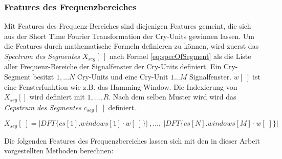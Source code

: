 \subsubsection*{Features des Frequenzbereiches}

Mit Features des Frequenz-Bereiches sind diejenigen Features gemeint, die sich aus der Short Time Fourier Transformation der Cry-Units gewinnen lassen. Um die Features durch mathematische Formeln definieren zu können, wird zuerst das \emph{Spectrum des Segmentes} $X_{seg}[\;]$ nach Formel \ref{eq:specOfSegment} als die Liste aller Frequenz-Bereiche der Signalfenster der Cry-Units definiert. Ein Cry-Segment besitzt $1 , \ldots N$ Cry-Units und eine Cry-Unit $1 \ldots M$ Signalfenster. $w[\;]$ ist eine Fensterfunktion wie z.B. das Hamming-Window. Die Indexierung von $X_{seg}[ ]$ wird definiert mit $1 , \ldots , R$. Nach dem selben Muster wird wird das \emph{Cepstrum des Segmentes} $c_{seg}[\;]$ definiert.

\begin{equation}
X_{seg}[\; ] = |DFT\{cs[1].windows[1] \cdot w[\;]\}|\ , \ldots,\ |DFT\{cs[N].windows[M] \cdot w[\;]\}|
\label{eq:specOfSegment}
\end{equation}

Die folgenden Features des Frequenzbereiches lassen sich mit den in dieser Arbeit vorgestellten Methoden berechnen:

